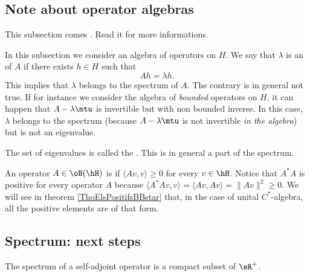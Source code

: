 \subsection{Note about operator algebras}

This subsection comes . Read it for more informations.

In this subsection we consider an algebra of operators on \( H\). We say that \( \lambda\) is an  of \( A\) if there exists \( h\in H\) such that
\begin{equation}
    Ah=\lambda h.
\end{equation}
This implies that \( \lambda\) belongs to the spectrum of \( A\). The contrary is in general not true. If for instance we consider the algebra of \emph{bounded} operators on \( H\), it can happen that \( A-\lambda\mtu\) is invertible but with non bounded inverse. In this case, \( \lambda\) belongs to the spectrum (because \( A-\lambda\mtu\) is not invertible \emph{in the algebra}) but is not an eigenvalue.

The set of eigenvalues is called the . This is in general a part of the spectrum.

An operator $A\in\oB(\hH)$ is  if $\langle Av, v\rangle \geq 0$ for every $v\in \hH$. Notice that $A^*A$ is positive for every operator $A$ because $\langle A^*Av, v\rangle =\langle Av, Av\rangle =\| Av \|^2\geq 0$. We will see in theorem \ref{ThoElsPositifsBBstar} that, in the case of unital $C^*$-algebra, all the positive elements are of that form. 

\subsection{Spectrum: next steps}

\begin{lemma}
The spectrum of a self-adjoint operator is a compact subset of $\eR^+$.
\end{lemma}

